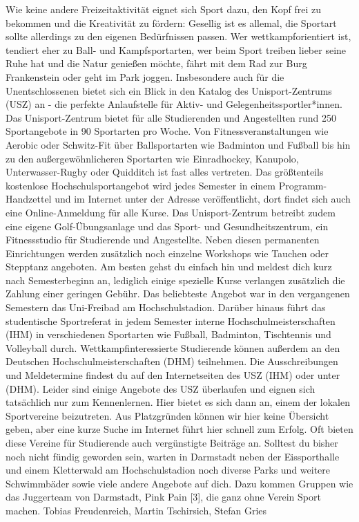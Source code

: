 {Wie keine andere Freizeitaktivität eignet sich Sport dazu, den Kopf frei zu bekommen und die Kreativität zu fördern: Gesellig ist es allemal, die Sportart sollte allerdings zu den eigenen Bedürfnissen passen.
}{
    Wer wettkampforientiert ist, tendiert eher zu Ball- und Kampfsportarten, wer beim Sport treiben lieber seine Ruhe hat und die Natur genießen möchte, fährt mit dem Rad zur Burg Frankenstein oder geht im Park joggen.
    Insbesondere auch für die Unentschlossenen bietet sich ein Blick in den Katalog des Unisport-Zentrums (USZ) an - die perfekte Anlaufstelle für Aktiv- und Gelegenheitssportler*innen. Das Unisport-Zentrum bietet für alle Studierenden und Angestellten rund 250 Sportangebote in 90 Sportarten pro Woche. Von Fitnessveranstaltungen wie Aerobic oder Schwitz-Fit über Ballsportarten wie Badminton und Fußball bis hin zu den außergewöhnlicheren Sportarten wie Einradhockey, Kanupolo, Unterwasser-Rugby oder Quidditch ist fast alles vertreten.
    Das größtenteils kostenlose Hochschulsportangebot wird jedes Semester in einem Programm-Handzettel und im Internet unter der Adresse \footnotemark[1]  veröffentlicht, dort findet sich auch eine Online-Anmeldung für alle Kurse. Das Unisport-Zentrum betreibt zudem eine eigene Golf-Übungsanlage und das Sport- und Gesundheitszentrum, ein Fitnessstudio für Studierende und Angestellte. Neben diesen permanenten Einrichtungen werden zusätzlich noch einzelne Workshops wie Tauchen oder Stepptanz angeboten.
    Am besten gehst du einfach hin und meldest dich kurz nach Semesterbeginn an, lediglich einige spezielle Kurse verlangen zusätzlich die Zahlung einer geringen Gebühr. Das beliebteste Angebot war in den vergangenen Semestern das Uni-Freibad am Hochschulstadion. Darüber hinaus führt das studentische Sportreferat in jedem Semester interne Hochschulmeisterschaften (IHM) in verschiedenen Sportarten wie Fußball, Badminton, Tischtennis und Volleyball durch. Wettkampfinteressierte Studierende können außerdem an den Deutschen Hochschulmeisterschaften (DHM) teilnehmen. Die Ausschreibungen und Meldetermine findest du auf den Internetseiten des USZ (IHM) oder unter \footnotemark[2] (DHM).
    Leider sind einige Angebote des USZ überlaufen und eignen sich tatsächlich nur zum Kennenlernen. Hier bietet es sich dann an, einem der lokalen Sportvereine beizutreten. Aus Platzgründen können wir hier keine Übersicht geben, aber eine kurze Suche im Internet führt hier schnell zum Erfolg. Oft bieten diese Vereine für Studierende auch vergünstigte Beiträge an.
    Solltest du bisher noch nicht fündig geworden sein, warten in Darmstadt neben der Eissporthalle und einem Kletterwald am Hochschulstadion noch diverse Parks und weitere Schwimmbäder sowie viele andere Angebote auf dich.
    Dazu kommen Gruppen wie das Juggerteam von Darmstadt, Pink Pain [3], die ganz ohne Verein Sport machen.
}
{Tobias Freudenreich, Martin Tschirsich, Stefan Gries}

\newpage
